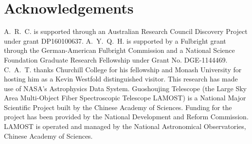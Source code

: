 \documentclass[a4paper,fleqn,usenatbib]{mnras}
\newcommand{\project}[1]{#1}
\newcommand{\lamost}{\project{LAMOST}}
\begin{document}




\section*{Acknowledgements}
A.~R.~C. is supported through an Australian Research Council Discovery Project under grant DP160100637.
A.~Y.~Q.~H. is supported by a Fulbright grant through the German-American Fulbright Commission and a National Science Foundation Graduate Research Fellowship under Grant No. DGE-1144469. 
C.~A.~T. thanks Churchill College for his fellowship and Monash University for hosting him as a Kevin Westfold distinguished visitor.
This research has made use of NASA's Astrophysics Data System.
Guoshoujing Telescope (the Large Sky Area Multi-Object Fiber Spectroscopic Telescope LAMOST) is a National Major Scientific Project built by the Chinese Academy of Sciences. Funding for the project has been provided by the National Development and Reform Commission. LAMOST is operated and managed by the National Astronomical Observatories, Chinese Academy of Sciences.









\bsp	%
\label{lastpage}
\end{document}
